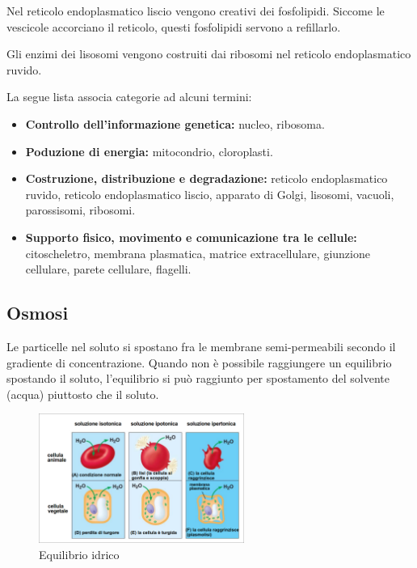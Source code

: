 \documentclass[a4paper]{article}
\begin{document}
Nel reticolo endoplasmatico liscio vengono creativi dei fosfolipidi.
Siccome le vescicole accorciano il reticolo, questi fosfolipidi servono a refillarlo.

Gli enzimi dei lisosomi vengono costruiti dai ribosomi nel reticolo endoplasmatico ruvido.

\wrapfill

La segue lista associa categorie ad alcuni termini:
\begin{itemize}
    \item \textbf{Controllo dell'informazione genetica:}
        nucleo, ribosoma.
    \item \textbf{Poduzione di energia:}
        mitocondrio, cloroplasti.
    \item \textbf{Costruzione, distribuzione e degradazione:}
        reticolo endoplasmatico ruvido,
        reticolo endoplasmatico liscio, apparato di Golgi,
        lisosomi, vacuoli, parossisomi, ribosomi.
    \item \textbf{Supporto fisico, movimento e comunicazione tra le cellule:}
        citoscheletro, membrana plasmatica, matrice extracellulare,
        giunzione cellulare, parete cellulare, flagelli.
\end{itemize}

\pagebreak

\subsection{Osmosi}

Le particelle nel soluto si spostano fra le membrane semi-permeabili secondo il gradiente
di concentrazione. Quando non è possibile raggiungere un equilibrio spostando il soluto,
l'equilibrio si può raggiunto per spostamento del solvente (acqua) piuttosto che il soluto.



\setlength{\intextsep}{0pt}%
\begin{figure}
    \includegraphics[width=0.6\textwidth]{./equilibrio_idrico.png}
    \caption{Equilibrio idrico}
    \vspace{-1cm}
\end{figure}
\end{document}
